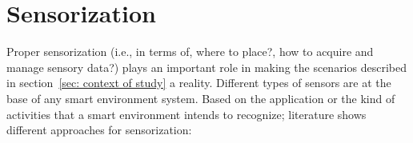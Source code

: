 \documentclass{thesisreport}
\begin{document}
 \section{Sensorization}
 Proper sensorization (i.e., in terms of, where to place?, how to acquire and manage sensory data?) plays an important role in making the scenarios described in section~\ref{sec: context of study} a reality. Different types of sensors are at the base of any smart environment system.  Based on the application or the kind of activities that a smart environment intends to recognize; literature shows different approaches for sensorization:
\end{document}
